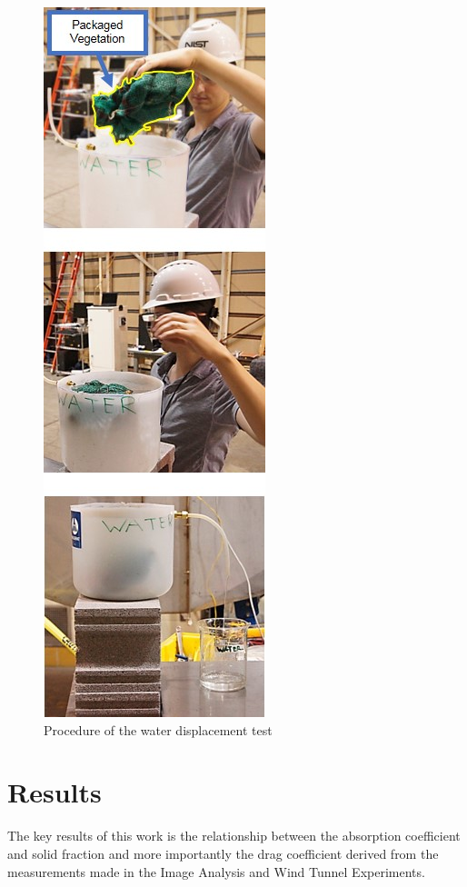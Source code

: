 \documentclass[12pt]{article}
\begin{document}
\begin{figure} [!]
	\centering 	\includegraphics[height=\textheight,keepaspectratio]{Picture7.jpg}
	\caption{Procedure of the water displacement test}
	\label{fig:wdt}
\end{figure}

\pagebreak


\section{Results}
\label{sec:results}
The key results of this work is the relationship between the absorption coefficient and solid fraction and more importantly the drag coefficient derived from the measurements made in the Image Analysis and Wind Tunnel Experiments.
\end{document}
